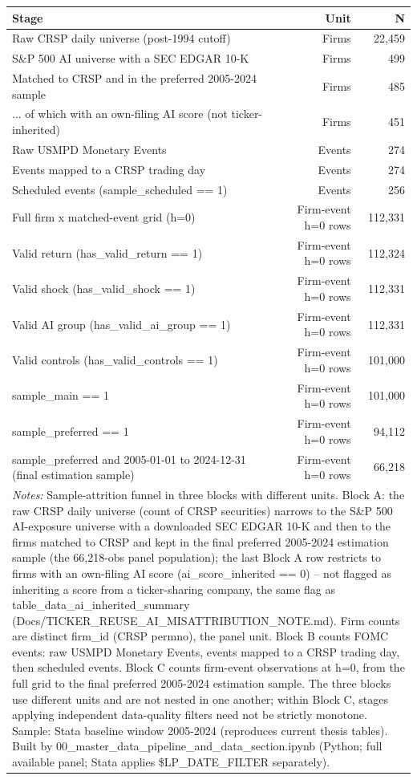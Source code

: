 \begin{tabular}{lrr}
\toprule
Stage & Unit & N \\
\midrule
Raw CRSP daily universe (post-1994 cutoff) & Firms & 22,459 \\
S\&P 500 AI universe with a SEC EDGAR 10-K & Firms & 499 \\
Matched to CRSP and in the preferred 2005-2024 sample & Firms & 485 \\
... of which with an own-filing AI score (not ticker-inherited) & Firms & 451 \\
Raw USMPD Monetary Events & Events & 274 \\
Events mapped to a CRSP trading day & Events & 274 \\
Scheduled events (sample\_scheduled == 1) & Events & 256 \\
Full firm x matched-event grid (h=0) & Firm-event h=0 rows & 112,331 \\
Valid return (has\_valid\_return == 1) & Firm-event h=0 rows & 112,324 \\
Valid shock (has\_valid\_shock == 1) & Firm-event h=0 rows & 112,331 \\
Valid AI group (has\_valid\_ai\_group == 1) & Firm-event h=0 rows & 112,331 \\
Valid controls (has\_valid\_controls == 1) & Firm-event h=0 rows & 101,000 \\
sample\_main == 1 & Firm-event h=0 rows & 101,000 \\
sample\_preferred == 1 & Firm-event h=0 rows & 94,112 \\
sample\_preferred and 2005-01-01 to 2024-12-31 (final estimation sample) & Firm-event h=0 rows & 66,218 \\
\bottomrule
\multicolumn{3}{p{0.95\linewidth}}{\footnotesize \textit{Notes:} Sample-attrition funnel in three blocks with different units. Block A: the raw CRSP daily universe (count of CRSP securities) narrows to the S\&P 500 AI-exposure universe with a downloaded SEC EDGAR 10-K and then to the firms matched to CRSP and kept in the final preferred 2005-2024 estimation sample (the 66,218-obs panel population); the last Block A row restricts to firms with an own-filing AI score (ai\_score\_inherited == 0) -- not flagged as inheriting a score from a ticker-sharing company, the same flag as table\_data\_ai\_inherited\_summary (Docs/TICKER\_REUSE\_AI\_MISATTRIBUTION\_NOTE.md). Firm counts are distinct firm\_id (CRSP permno), the panel unit. Block B counts FOMC events: raw USMPD Monetary Events, events mapped to a CRSP trading day, then scheduled events. Block C counts firm-event observations at h=0, from the full grid to the final preferred 2005-2024 estimation sample. The three blocks use different units and are not nested in one another; within Block C, stages applying independent data-quality filters need not be strictly monotone. Sample: Stata baseline window 2005-2024 (reproduces current thesis tables). Built by 00\_master\_data\_pipeline\_and\_data\_section.ipynb (Python; full available panel; Stata applies \$LP\_DATE\_FILTER separately).} \\
\end{tabular}
